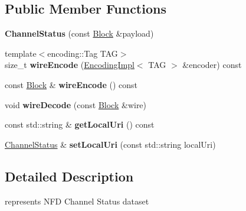 \subsection*{Public Member Functions}
\begin{DoxyCompactItemize}
\item 
{\bfseries Channel\+Status} (const \hyperlink{classndn_1_1Block}{Block} \&payload)\hypertarget{classndn_1_1nfd_1_1ChannelStatus_a0816257b7d36ed4f52631b53685ce756}{}\label{classndn_1_1nfd_1_1ChannelStatus_a0816257b7d36ed4f52631b53685ce756}

\item 
{\footnotesize template$<$encoding\+::\+Tag T\+AG$>$ }\\size\+\_\+t {\bfseries wire\+Encode} (\hyperlink{classndn_1_1encoding_1_1EncodingImpl}{Encoding\+Impl}$<$ T\+AG $>$ \&encoder) const\hypertarget{classndn_1_1nfd_1_1ChannelStatus_a6f0c952450ba799c03661026dc797a34}{}\label{classndn_1_1nfd_1_1ChannelStatus_a6f0c952450ba799c03661026dc797a34}

\item 
const \hyperlink{classndn_1_1Block}{Block} \& {\bfseries wire\+Encode} () const\hypertarget{classndn_1_1nfd_1_1ChannelStatus_ad9a5d323027db59c0309153b690b47de}{}\label{classndn_1_1nfd_1_1ChannelStatus_ad9a5d323027db59c0309153b690b47de}

\item 
void {\bfseries wire\+Decode} (const \hyperlink{classndn_1_1Block}{Block} \&wire)\hypertarget{classndn_1_1nfd_1_1ChannelStatus_a8d9fc143552c6f73be138d738bc07fba}{}\label{classndn_1_1nfd_1_1ChannelStatus_a8d9fc143552c6f73be138d738bc07fba}

\item 
const std\+::string \& {\bfseries get\+Local\+Uri} () const\hypertarget{classndn_1_1nfd_1_1ChannelStatus_a1d6e93dc25a4a47e3e2fbd38a5e15ba3}{}\label{classndn_1_1nfd_1_1ChannelStatus_a1d6e93dc25a4a47e3e2fbd38a5e15ba3}

\item 
\hyperlink{classndn_1_1nfd_1_1ChannelStatus}{Channel\+Status} \& {\bfseries set\+Local\+Uri} (const std\+::string local\+Uri)\hypertarget{classndn_1_1nfd_1_1ChannelStatus_a7923a08f8de7583e231f4395306e235f}{}\label{classndn_1_1nfd_1_1ChannelStatus_a7923a08f8de7583e231f4395306e235f}

\end{DoxyCompactItemize}


\subsection{Detailed Description}
represents N\+FD Channel Status dataset 

